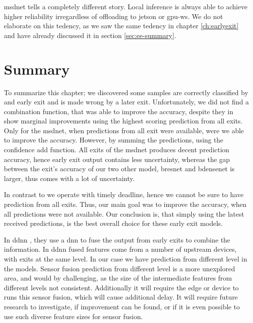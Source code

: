 \gls{msdnet} tells a completely different story. Local inference is always able to achieve higher reliability irregardless of offloading to \gls{jetson} or \gls{gpu-ws}. We do not elaborate on this tedency, as we saw the same tedency in chapter \ref{ch:earlyexit} and have already discussed it in section \ref{sec:ee-summary}.

\section{Summary} \label{sec:edge-summary}

To summarize this chapter; we discovered some samples are correctly classified by and early exit and is made wrong by a later exit. Unfortunately, we did not find a combination function, that was able to improve the accuracy, despite they in \cite{kaya_shallow-deep_nodate} show marginal improvements using the highest scoring prediction from all exits. Only for the \gls{msdnet}, when predictions from all exit were available, were we able to improve the accuracy. However, by summing the predictions, using the confidence add function. All exits of the \gls{msdnet} produces decent prediction accuracy, hence early exit output contains less uncertainty, whereas the gap between the exit's accuracy of our two other model, \gls{bresnet} and \gls{bdensenet} is larger, thus comes with a lot of uncertainty. 

In contrast to \cite{kaya_shallow-deep_nodate} we operate with timely deadline, hence we cannot be sure to have prediction from all exits. Thus, our main goal was to improve the accuracy, when all predictions were not available. Our conclusion is, that simply using the latest received predictions, is the best overall choice for these early exit models. 

In \gls{ddnn} \cite{teerapittayanon_distributed_2017}, they use a \gls{dnn} to fuse the output from early exits to combine the information. In \gls{ddnn} fused features come from a number of upstream devices, with exits at the same level. In our case we have prediction from different level in the models. Sensor fusion prediction from different level is a more unexplored area, and would by challenging, as the size of the intermediate features from different levels not consistent. Additionally it will require the edge or device to runs this sensor fusion, which will cause additional delay. It will require future research to investigate, if improvement can be found, or if it is even possible to use such diverse feature sizes for sensor fusion.

